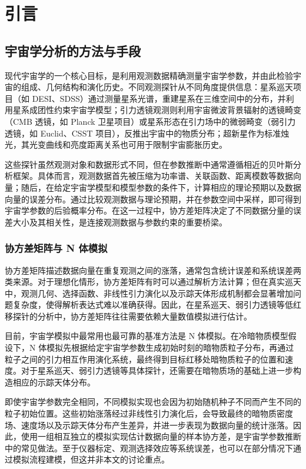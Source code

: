 
\chapter{引言}

\section{宇宙学分析的方法与手段}

现代宇宙学的一个核心目标，是利用观测数据精确测量宇宙学参数，并由此检验宇宙的组成、几何结构和演化历史。不同观测探针从不同角度提供信息：星系巡天项目（如 DESI、SDSS）通过测量星系光谱，重建星系在三维空间中的分布，并利用星系成团性约束宇宙学模型\citep{adame2025desi}；引力透镜观测则利用宇宙微波背景辐射的透镜畸变（CMB 透镜，如 Planck 卫星项目）或星系形态在引力场中的微弱畸变（弱引力透镜，如 Euclid、CSST 项目），反推出宇宙中的物质分布\citep{planck2016cosmological,euclid2020forecast,kitching2015weaklensing}；超新星作为标准烛光，其光变曲线和亮度距离关系也可用于限制宇宙膨胀历史。

这些探针虽然观测对象和数据形式不同，但在参数推断中通常遵循相近的贝叶斯分析框架。具体而言，观测数据首先被压缩为功率谱、关联函数、距离模数等数据向量；随后，在给定宇宙学模型和模型参数的条件下，计算相应的理论预期以及数据向量的误差分布。通过比较观测数据与理论预期，并在参数空间中采样，即可得到宇宙学参数的后验概率分布。在这一过程中，协方差矩阵决定了不同数据分量的误差大小及其相关性，是连接观测数据与参数约束的重要桥梁。

\subsection{协方差矩阵与 N 体模拟}

协方差矩阵描述数据向量在重复观测之间的涨落，通常包含统计误差和系统误差两类来源。对于理想化情形，协方差矩阵有时可以通过解析方法计算；但在真实巡天中，观测几何、选择函数、非线性引力演化以及示踪天体形成机制都会显著增加问题复杂度，使得解析表达式难以准确获得。因此，在星系巡天、弱引力透镜等低红移探针的分析中，协方差矩阵往往需要依赖大量数值模拟进行估计。

目前，宇宙学模拟中最常用也最可靠的基准方法是 N 体模拟。在冷暗物质模型假设下，N 体模拟先根据给定宇宙学参数生成初始时刻的暗物质粒子分布，再通过粒子之间的引力相互作用演化系统，最终得到目标红移处暗物质粒子的位置和速度\citep{springel2021gadget4}。对于星系巡天、弱引力透镜等具体探针，还需要在暗物质场的基础上进一步构造相应的示踪天体分布。

即使宇宙学参数完全相同，不同模拟实现也会因为初始随机种子不同而产生不同的粒子初始位置。这些初始涨落经过非线性引力演化后，会导致最终的暗物质密度场、速度场以及示踪天体分布产生差异，并进一步表现为数据向量的统计涨落。因此，使用一组相互独立的模拟实现估计数据向量的样本协方差，是宇宙学参数推断中的常见做法。至于仪器标定、观测选择效应等系统误差，也可以在部分情况下通过模拟流程建模，但这并非本文的讨论重点。

